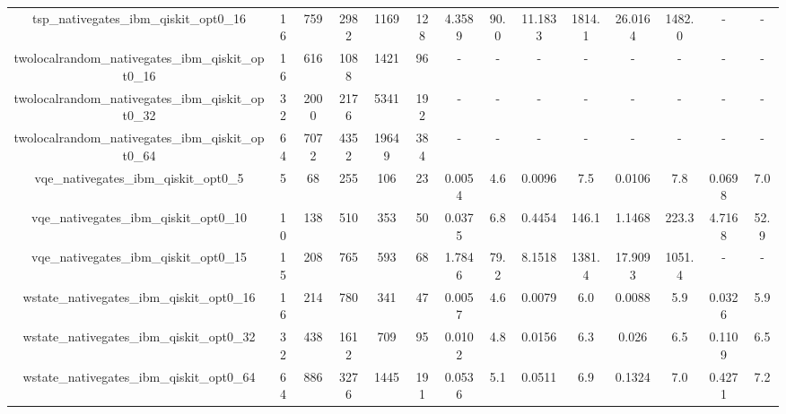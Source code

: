 \begin{table}[htb]
{\begin{tabular}{|c|c|c|c|c|c|c|c|c|c|c|c|c|c|}
tsp\_nativegates\_ibm\_qiskit\_opt0\_16 & 16 & 759 & 2982 & 1169 & 128 & 4.3589 & 90.0 & 11.1833 & 1814.1 & 26.0164 & 1482.0 & - & - \\ 
twolocalrandom\_nativegates\_ibm\_qiskit\_opt0\_16 & 16 & 616 & 1088 & 1421 & 96 & - & - & - & - & - & - & - & - \\ 
twolocalrandom\_nativegates\_ibm\_qiskit\_opt0\_32 & 32 & 2000 & 2176 & 5341 & 192 & - & - & - & - & - & - & - & - \\ 
twolocalrandom\_nativegates\_ibm\_qiskit\_opt0\_64 & 64 & 7072 & 4352 & 19649 & 384 & - & - & - & - & - & - & - & - \\ 
vqe\_nativegates\_ibm\_qiskit\_opt0\_5 & 5 & 68 & 255 & 106 & 23 & 0.0054 & 4.6 & 0.0096 & 7.5 & 0.0106 & 7.8 & 0.0698 & 7.0 \\ 
vqe\_nativegates\_ibm\_qiskit\_opt0\_10 & 10 & 138 & 510 & 353 & 50 & 0.0375 & 6.8 & 0.4454 & 146.1 & 1.1468 & 223.3 & 4.7168 & 52.9 \\ 
vqe\_nativegates\_ibm\_qiskit\_opt0\_15 & 15 & 208 & 765 & 593 & 68 & 1.7846 & 79.2 & 8.1518 & 1381.4 & 17.9093 & 1051.4 & - & - \\ 
wstate\_nativegates\_ibm\_qiskit\_opt0\_16 & 16 & 214 & 780 & 341 & 47 & 0.0057 & 4.6 & 0.0079 & 6.0 & 0.0088 & 5.9 & 0.0326 & 5.9 \\ 
wstate\_nativegates\_ibm\_qiskit\_opt0\_32 & 32 & 438 & 1612 & 709 & 95 & 0.0102 & 4.8 & 0.0156 & 6.3 & 0.026 & 6.5 & 0.1109 & 6.5 \\ 
wstate\_nativegates\_ibm\_qiskit\_opt0\_64 & 64 & 886 & 3276 & 1445 & 191 & 0.0536 & 5.1 & 0.0511 & 6.9 & 0.1324 & 7.0 & 0.4271 & 7.2 \\ 
\hline 
\end{tabular}} 
\end{table} 
